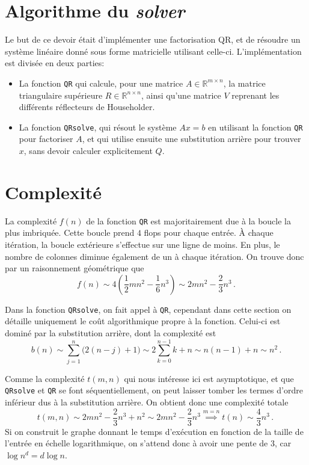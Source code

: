 \documentclass[11pt]{article}
\begin{document}
\section{Algorithme du \emph{solver}}
Le but de ce devoir était d'implémenter une factorisation QR, et de résoudre un système linéaire donné sous forme matricielle utilisant celle-ci.
L'implémentation est divisée en deux parties:
\begin{itemize}
	\item La fonction \texttt{QR} qui calcule, pour une matrice $A \in \mathbb{R}^{m \times n}$, la matrice triangulaire supérieure $R \in \mathbb{R}^{n \times n}$, ainsi qu'une matrice $V$ reprenant les différents réflecteurs de Householder.
	\item La fonction \texttt{QRsolve}, qui résout le système $Ax = b$ en utilisant la fonction \texttt{QR} pour factoriser $A$, et qui utilise ensuite une substitution arrière pour trouver $x$, sans devoir calculer explicitement $Q$. 
\end{itemize}

\section{Complexité}
\label{sec:complexity}
 La complexité $f(n)$ de la fonction \texttt{QR} est majoritairement due à la boucle la plus imbriquée. Cette boucle prend $4$ flops pour chaque entrée.
À chaque itération, la boucle extérieure s'effectue sur une ligne de moins.
En plus, le nombre de colonnes diminue également de un à chaque itération.
On trouve donc par un raisonnement géométrique que
\[
f(n) \sim 4 \left( \frac{1}{2} mn^2 - \frac{1}{6} n^3 \right) \sim  2 mn^2 - \frac{2}{3}n^3\,.
\]

 Dans la fonction \texttt{QRsolve}, on fait appel à \texttt{QR},
cependant dans cette section on détaille uniquement le coût algorithmique propre à la fonction.
Celui-ci est dominé par la substitution arrière,
dont la complexité est
\[
b(n) \sim \sum_{j=1}^{n} \big(2(n - j) + 1 \big) \sim 2 \sum_{k=0}^{n-1} k + n \sim n (n - 1) + n \sim n^2\,.
\]

 Comme la complexité $t(m, n)$ qui nous intéresse ici est asymptotique,
et que \texttt{QRsolve} et \texttt{QR} se font séquentiellement,
on peut laisser tomber les termes d'ordre inférieur dus à la substitution arrière.
On obtient donc une complexité totale
\[
t(m, n) \sim 2 mn^2 - \frac{2}{3}n^3 + n^2 \sim 2mn^2 - \frac{2}{3}n^3 \overset{m = n}{\implies} t(n) \sim \frac{4}{3} n^3\,.\ 
\]
Si on construit le graphe donnant le temps d'exécution en fonction de la taille de l'entrée en échelle logarithmique,
on s'attend donc à avoir une pente de $3$, car $\log n^d = d \log n$.
\end{document}
